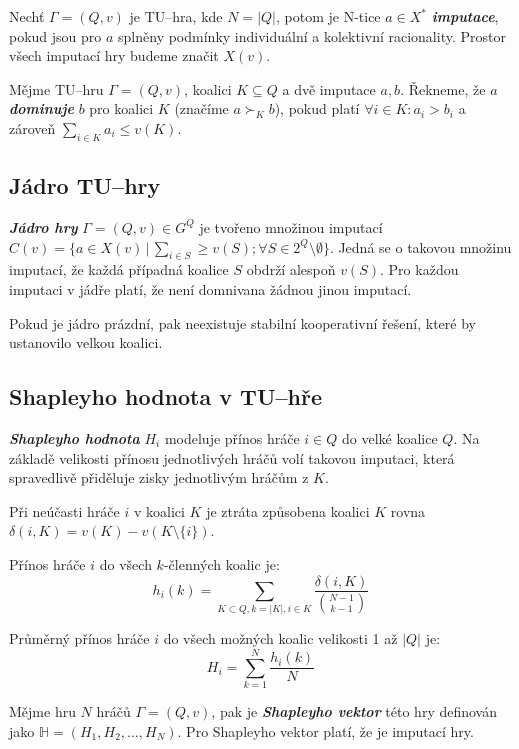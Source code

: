         Nechť $\Gamma = (Q, v)$ je TU--hra, kde $N = |Q|$, potom je N-tice $a \in X^*$ \textit{\textbf{imputace}}, pokud jsou pro $a$ splněny podmínky individuální a kolektivní racionality. Prostor všech imputací hry budeme značit $X(v)$.

        Mějme TU--hru $\Gamma = (Q, v)$, koalici $K \subseteq Q$ a dvě imputace $a, b$. Řekneme, že $a$ \textit{\textbf{dominuje}} $b$ pro koalici $K$ (značíme $a \succ_K b$), pokud platí $\forall i \in K: a_i > b_i$ a zároveň $\sum_{i \in K}a_i \leq v(K)$.

    \subsection{Jádro TU--hry}
        \textit{\textbf{Jádro hry}} $\Gamma = (Q, v) \in G^Q$ je tvořeno množinou imputací $C(v) = \{a \in X(v)\,|\,\sum_{i \in S} \geq v(S); \forall S \in 2^Q \setminus \emptyset\}$. Jedná se o takovou množinu imputací, že každá případná koalice $S$ obdrží alespoň $v(S)$. Pro každou imputaci v jádře platí, že není domnivana žádnou jinou imputací.

        Pokud je jádro prázdní, pak neexistuje stabilní kooperativní řešení, které by ustanovilo velkou koalici.

    \subsection{Shapleyho hodnota v TU--hře}
        \textit{\textbf{Shapleyho hodnota}} \cite{Shapley1969} $H_i$ modeluje přínos hráče $i \in Q$ do velké koalice $Q$. Na základě velikosti přínosu jednotlivých hráčů volí takovou imputaci, která spravedlivě přiděluje zisky jednotlivým hráčům z $K$.

        Při neúčasti hráče $i$ v koalici $K$ je ztráta způsobena koalici $K$ rovna $\delta(i, K) = v(K) - v(K \setminus \{i\})$.

        Přínos hráče $i$ do všech $k$-členných koalic je:
        \vspace*{-0.3em}
        $$
        h_i(k) = \sum_{K \subset Q, k = |K|, i \in K}\frac{\delta(i, K)}{{{N-1} \choose {k-1}}}
        $$

        Průměrný přínos hráče $i$ do všech možných koalic velikosti 1 až $|Q|$ je:
        \vspace*{-0.3em}
        $$
        H_i = \sum^N_{k = 1}\frac{h_i(k)}{N}
        $$

        Mějme hru $N$ hráčů $\Gamma = (Q, v)$, pak je \textit{\textbf{Shapleyho vektor}} této hry definován jako $\mathbb{H} = (H_1, H_2, \dots, H_N)$. Pro Shapleyho vektor platí, že je imputací hry.


